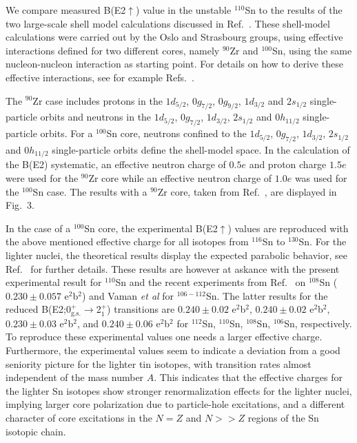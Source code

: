 \documentclass[prc]{revtex4}
\begin{document}
We compare measured B(E2$\uparrow$) value in the
unstable $^{110}$Sn to the results of the two 
large-scale shell model calculations discussed in Ref.~\cite{banu}. 
These shell-model calculations were carried out by the Oslo and Strasbourg groups,
using effective interactions defined for two different cores, namely 
$^{90}$Zr and $^{100}$Sn, using the same nucleon-nucleon interaction
as starting point. For details on how to derive these effective
interactions, see for example Refs.~\cite{banu,hko95}.

The $^{90}$Zr case includes protons in the 
$1d_{5/2}$,
$0g_{7/2}$, $0g_{9/2}$, 
$1d_{3/2}$ and $2s_{1/2}$ single-particle orbits and neutrons
in the $1d_{5/2}$,
$0g_{7/2}$, $1d_{3/2}$, $2s_{1/2}$ and $0h_{11/2}$ single-particle orbits. 
For a $^{100}$Sn core, neutrons confined to the  
$1d_{5/2}$,
$0g_{7/2}$, $1d_{3/2}$, $2s_{1/2}$ and $0h_{11/2}$ single-particle orbits 
define the shell-model space. 
In the calculation of 
the B(E2) systematic, an effective neutron charge of $0.5e$ and proton charge $1.5e$ were used for the 
$^{90}$Zr core while an effective neutron  charge of $1.0e$ was used for the $^{100}$Sn case.
The results with a $^{90}$Zr core, taken from Ref.~\cite{banu},  are displayed in Fig.~3.

In the case of a $^{100}$Sn core, the experimental B(E2$\uparrow$)
values are reproduced with the above mentioned effective charge
for all isotopes from $^{116}$Sn to $^{130}$Sn. 
For the lighter nuclei, the theoretical results display the expected parabolic behavior,
see Ref.~\cite{banu} for further details.
These results are however at askance with the present experimental result for $^{110}$Sn and 
the recent experiments  from
Ref.~\cite{banu} on $^{108}$Sn ($0.230\pm 0.057$ e$^2$b$^2$) and Vaman {\em et al} \cite{vaman} 
for $^{106-112}$Sn. The latter results for the reduced 
B(E2;0$^+_{\text{g.s.}}$$\to$2$^{+}_1$) transitions are $0.240\pm 0.02$ e$^2$b$^2$,
$0.240\pm 0.02$ e$^2$b$^2$, $0.230\pm 0.03$ e$^2$b$^2$, and $0.240\pm 0.06$ e$^2$b$^2$ for
$^{112}$Sn, $^{110}$Sn, $^{108}$Sn, $^{106}$Sn, respectively.
To reproduce these experimental values one needs a larger effective charge. Furthermore, the experimental
values seem to indicate a deviation from a good seniority picture for the lighter tin isotopes,
with transition rates almost independent of the mass number $A$.
This indicates that
the effective charges for the lighter Sn isotopes show stronger
renormalization effects for the lighter nuclei, implying larger core polarization due to
particle-hole excitations, and a different character of core
excitations in the $N = Z$ and $N >> Z$ regions of the Sn isotopic
chain.
\end{document}
